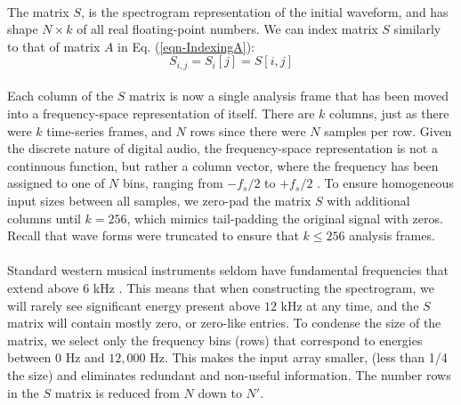 \documentclass[12pt,letterpaper]{article}
\begin{document}
\paragraph*{}The matrix $S$, is the spectrogram representation of the initial waveform, and has shape $N \times k$ of all real floating-point numbers. We can index matrix $S$ similarly to that of matrix $A$ in Eq. (\ref{eqn-IndexingA}):
\begin{equation}
\label{eqn-IndexingS}
S_{i,j} = S_i[j] = S[i,j]
\end{equation}

\paragraph*{}Each column of the $S$ matrix is now a single analysis frame that has been moved into a frequency-space representation of itself. There are $k$ columns, just as there were $k$ time-series frames, and $N$ rows since there were $N$ samples per row. Given the discrete nature of digital audio, the frequency-space representation is not a continuous function, but rather a column vector, where the frequency has been assigned to one of $N$ bins, ranging from $-f_s / 2$ to $+f_s/2$ \cite{Short,Peatross}. To ensure homogeneous input sizes between all samples, we zero-pad the matrix $S$ with additional columns until $k = 256$, which mimics tail-padding the original signal with zeros. Recall that wave forms were truncated to ensure that $k \leq 256$ analysis frames.

\paragraph*{}Standard western musical instruments seldom have fundamental frequencies that extend above $6$ kHz \cite{Olson,Virtanen,White}. This means that when constructing the spectrogram, we will rarely see significant energy present above $12$ kHz at any time, and the $S$ matrix will contain mostly zero, or zero-like entries. To condense the size of the matrix, we select only the frequency bins (rows) that correspond to energies between $0$ Hz and $12,000$ Hz. This makes the input array smaller, (less than 1/4 the size) and eliminates redundant and non-useful information. The number rows in the $S$ matrix is reduced from $N$ down to $N'$. 
\end{document}
